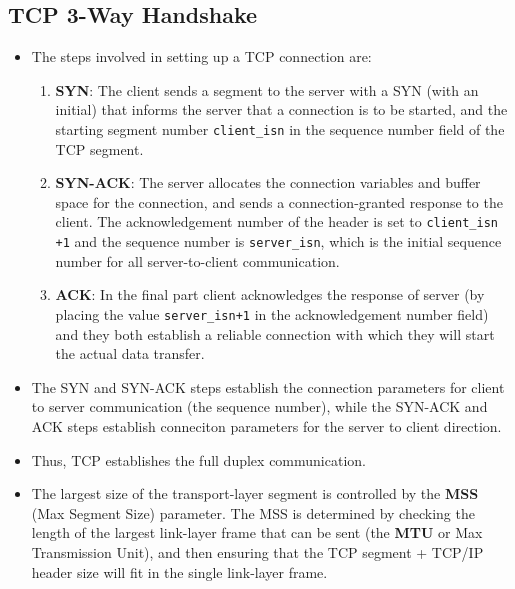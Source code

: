 \documentclass{article}
\theoremstyle{plain}
\theoremstyle{definition}
\begin{document}
\subsection{TCP 3-Way Handshake}
\begin{itemize}
    \item The steps involved in setting up a TCP connection are:
    \begin{enumerate}
        \item \textbf{SYN}: The client sends a segment to the server with a SYN (with an initial) that informs the server that a connection is to be started, and the starting segment number \texttt{client\_isn} in the sequence number field of the TCP segment. 
        
        \item \textbf{SYN-ACK}: The server allocates the connection variables and buffer space for the connection, and sends a connection-granted response to the client. The acknowledgement number of the header is set to \texttt{client\_isn +1} and the sequence number is \texttt{server\_isn}, which is the initial sequence number for all server-to-client communication. 
        
        \item \textbf{ACK}: In the final part client acknowledges the response of server (by placing the value \texttt{server\_isn+1} in the acknowledgement number field) and they both establish a reliable connection with which they will start the actual data transfer. 
    \end{enumerate}
    \item The SYN and SYN-ACK steps establish the connection parameters for client to server communication (the sequence number), while the SYN-ACK and ACK steps establish conneciton parameters for the server to client direction. 
    
    \item Thus, TCP establishes the full duplex communication. 
    
    \item The largest size of the transport-layer segment is controlled by the \textbf{MSS} (Max Segment Size) parameter. The MSS is determined by checking the length of the largest link-layer frame that can be sent (the \textbf{MTU} or Max Transmission Unit), and then ensuring that the TCP segment + TCP/IP header size will fit in the single link-layer frame. 
\end{itemize}
\end{document}
